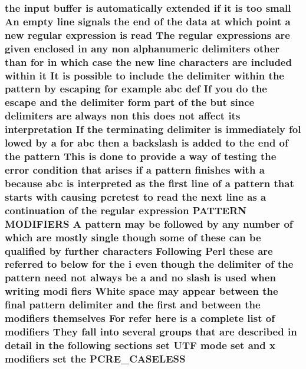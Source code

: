 \subsubsection[{\texorpdfstring{P\+C\+R\+E\+\_\+\+C\+A\+S\+E\+L\+E\+SS}{PCRE_CASELESS}}]{\setlength{\rightskip}{0pt plus 5cm}the {\bf input} {\bf buffer} {\bf is} automatically extended {\bf if} {\bf it} {\bf is} too small An {\bf empty} {\bf line} signals the {\bf end} {\bf of} the {\bf data} at {\bf which} {\bf point} {\bf a} new regular {\bf expression} {\bf is} {\bf read} The regular {\bf expressions} {\bf are} {\bf given} enclosed {\bf in} {\bf any} non {\bf alphanumeric} delimiters other {\bf than} for {\bf in} {\bf which} {\bf case} the new {\bf line} {\bf characters} {\bf are} {\bf included} within {\bf it} It {\bf is} {\bf possible} {\bf to} {\bf include} the delimiter within the {\bf pattern} by escaping for {\bf example} {\bf abc} def If you {\bf do} the escape and the delimiter form part {\bf of} the but since delimiters {\bf are} always non {\bf this} does {\bf not} affect its interpretation If the terminating delimiter {\bf is} immediately fol lowed by {\bf a} for {\bf abc} then {\bf a} {\bf backslash} {\bf is} added {\bf to} the {\bf end} {\bf of} the {\bf pattern} This {\bf is} {\bf done} {\bf to} provide {\bf a} {\bf way} {\bf of} testing the {\bf error} condition that {\bf arises} {\bf if} {\bf a} {\bf pattern} finishes {\bf with} {\bf a} because {\bf abc} {\bf is} interpreted {\bf as} the {\bf first} {\bf line} {\bf of} {\bf a} {\bf pattern} that starts {\bf with} causing {\bf pcretest} {\bf to} {\bf read} the next {\bf line} {\bf as} {\bf a} continuation {\bf of} the regular {\bf expression} P\+A\+T\+T\+E\+RN M\+O\+D\+I\+F\+I\+E\+RS {\bf A} {\bf pattern} may {\bf be} followed by {\bf any} {\bf number} {\bf of} {\bf which} {\bf are} mostly single {\bf though} some {\bf of} these {\bf can} {\bf be} qualified by further {\bf characters} Following {\bf Perl} these {\bf are} referred {\bf to} {\bf below} for the {\bf i} even {\bf though} the delimiter {\bf of} the {\bf pattern} need {\bf not} always {\bf be} {\bf a} and no {\bf slash} {\bf is} {\bf used} when writing modi fiers White {\bf space} may appear between the final {\bf pattern} delimiter and the {\bf first} and between the {\bf modifiers} {\bf themselves} For refer {\bf here} {\bf is} {\bf a} complete {\bf list} {\bf of} {\bf modifiers} They fall into several groups that {\bf are} described {\bf in} detail {\bf in} the following sections {\bf set} U\+TF {\bf mode} {\bf set} and {\bf x} {\bf modifiers} {\bf set} the P\+C\+R\+E\+\_\+\+C\+A\+S\+E\+L\+E\+SS}\hypertarget{pcretest_8txt_afe078dbdccac820dbb524b1eb5c1a30c}{}\label{pcretest_8txt_afe078dbdccac820dbb524b1eb5c1a30c}
